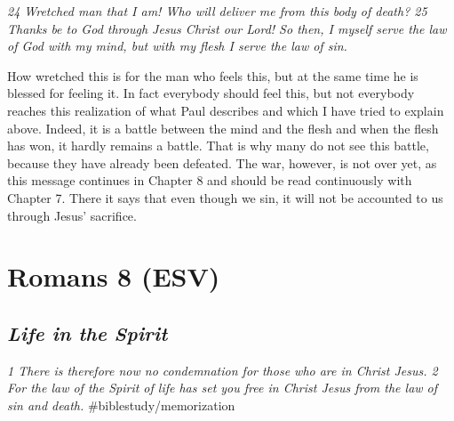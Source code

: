 \emph{24 Wretched man that I am! Who will deliver me from this body of
death? 25 Thanks be to God through Jesus Christ our Lord! So then, I
myself serve the law of God with my mind, but with my flesh I serve the
law of sin.}

How wretched this is for the man who feels this, but at the same time he
is blessed for feeling it. In fact everybody should feel this, but not
everybody reaches this realization of what Paul describes and which I
have tried to explain above. Indeed, it is a battle between the mind and
the flesh and when the flesh has won, it hardly remains a battle. That
is why many do not see this battle, because they have already been
defeated. The war, however, is not over yet, as this message continues
in Chapter 8 and should be read continuously with Chapter 7. There it
says that even though we sin, it will not be accounted to us through
Jesus' sacrifice.



\hypertarget{romans-8-esv}{%
\section{Romans 8 (ESV)}\label{romans-8-esv}}
\vspace{10.5cm}
\subsection{\emph{Life in the Spirit}} \emph{1 There is therefore now no
condemnation for those who are in Christ Jesus. 2 For the law of the
Spirit of life has set you free in Christ Jesus from the law of sin and
death.} \#biblestudy/memorization

